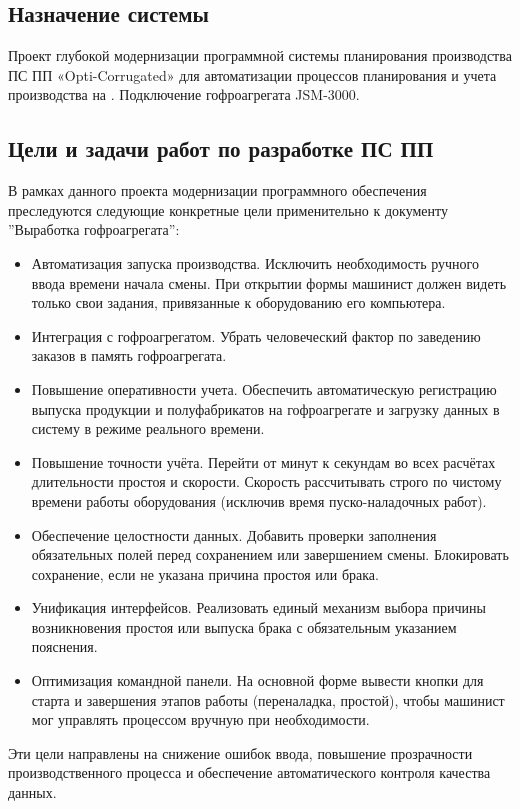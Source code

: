 



\subsection{Назначение системы}
Проект глубокой модернизации программной системы планирования производства ПС ПП «Opti-Corrugated» для автоматизации процессов планирования и учета производства на \FIRMA. Подключение гофроагрегата JSM-3000.




\subsection{Цели и задачи работ по разработке ПС ПП}

В рамках данного проекта модернизации программного обеспечения преследуются следующие конкретные цели применительно к документу ''Выработка гофроагрегата'':

\begin{itemize}
    \item Автоматизация запуска производства. Исключить необходимость ручного ввода времени начала смены. При открытии формы машинист должен видеть только свои задания, привязанные к оборудованию его компьютера.
        \item Интеграция с гофроагрегатом. Убрать человеческий фактор по заведению заказов в память гофроагрегата.
    \item Повышение оперативности учета. Обеспечить автоматическую регистрацию выпуска продукции и полуфабрикатов на гофроагрегате и загрузку данных в систему \gofro в режиме реального времени.

    \item Повышение точности учёта. Перейти от минут к секундам во всех расчётах длительности простоя и скорости. Скорость рассчитывать строго по чистому времени работы оборудования (исключив время пуско-наладочных работ).
    \item Обеспечение целостности данных. Добавить проверки заполнения обязательных полей перед сохранением или завершением смены. Блокировать сохранение, если не указана причина простоя или брака.
    \item Унификация интерфейсов. Реализовать единый механизм выбора причины возникновения простоя или выпуска брака с обязательным указанием пояснения. %
    \item Оптимизация командной панели. На основной форме вывести кнопки для старта и завершения этапов работы (переналадка, простой), чтобы машинист мог управлять процессом вручную при необходимости.

\end{itemize}

Эти цели направлены на снижение ошибок ввода, повышение прозрачности производственного процесса и обеспечение автоматического контроля качества данных.

